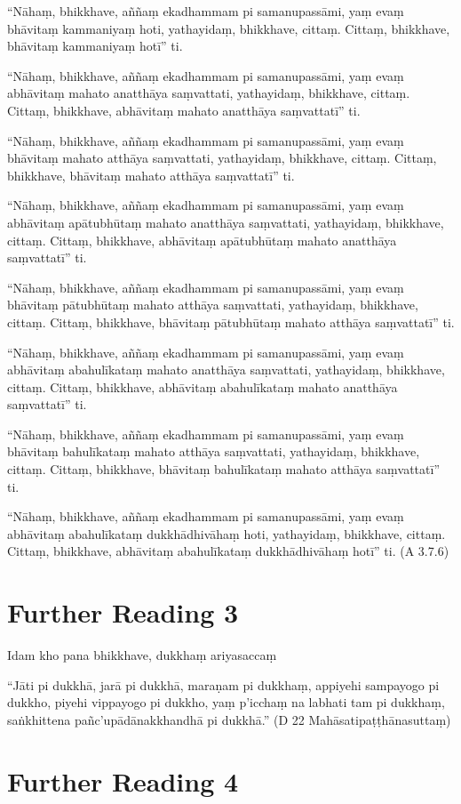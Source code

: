 “Nāhaṃ, bhikkhave, aññaṃ ekadhammam pi samanupassāmi, yaṃ evaṃ bhāvitaṃ kammaniyaṃ hoti, yathayidaṃ, bhikkhave, cittaṃ. Cittaṃ, bhikkhave, bhāvitaṃ kammaniyaṃ hotī” ti.

“Nāhaṃ, bhikkhave, aññaṃ ekadhammam pi samanupassāmi, yaṃ evaṃ abhāvitaṃ mahato anatthāya saṃvattati, yathayidaṃ, bhikkhave, cittaṃ. Cittaṃ, bhikkhave, abhāvitaṃ mahato anatthāya saṃvattatī” ti.

“Nāhaṃ, bhikkhave, aññaṃ ekadhammam pi samanupassāmi, yaṃ evaṃ bhāvitaṃ mahato atthāya saṃvattati, yathayidaṃ, bhikkhave, cittaṃ. Cittaṃ, bhikkhave, bhāvitaṃ mahato atthāya saṃvattatī” ti.

“Nāhaṃ, bhikkhave, aññaṃ ekadhammam pi samanupassāmi, yaṃ evaṃ abhāvitaṃ apātubhūtaṃ mahato anatthāya saṃvattati, yathayidaṃ, bhikkhave, cittaṃ. Cittaṃ, bhikkhave, abhāvitaṃ apātubhūtaṃ mahato anatthāya saṃvattatī” ti.

“Nāhaṃ, bhikkhave, aññaṃ ekadhammam pi samanupassāmi, yaṃ evaṃ bhāvitaṃ pātubhūtaṃ mahato atthāya saṃvattati, yathayidaṃ, bhikkhave, cittaṃ. Cittaṃ, bhikkhave, bhāvitaṃ pātubhūtaṃ mahato atthāya saṃvattatī” ti.

“Nāhaṃ, bhikkhave, aññaṃ ekadhammam pi samanupassāmi, yaṃ evaṃ abhāvitaṃ abahulīkataṃ mahato anatthāya saṃvattati, yathayidaṃ, bhikkhave, cittaṃ. Cittaṃ, bhikkhave, abhāvitaṃ abahulīkataṃ mahato anatthāya saṃvattatī” ti.

“Nāhaṃ, bhikkhave, aññaṃ ekadhammam pi samanupassāmi, yaṃ evaṃ bhāvitaṃ bahulīkataṃ mahato atthāya saṃvattati, yathayidaṃ, bhikkhave, cittaṃ. Cittaṃ, bhikkhave, bhāvitaṃ bahulīkataṃ mahato atthāya saṃvattatī” ti.

“Nāhaṃ, bhikkhave, aññaṃ ekadhammam pi samanupassāmi, yaṃ evaṃ abhāvitaṃ abahulīkataṃ dukkhādhivāhaṃ hoti, yathayidaṃ, bhikkhave, cittaṃ. Cittaṃ, bhikkhave, abhāvitaṃ abahulīkataṃ dukkhādhivāhaṃ hotī” ti. (A 3.7.6)

\section*{Further Reading 3}

Idam kho pana bhikkhave, dukkhaṃ ariyasaccaṃ

“Jāti pi dukkhā, jarā pi dukkhā, maraṇam pi dukkhaṃ, appiyehi sampayogo pi dukkho, piyehi vippayogo pi dukkho‚ yaṃ p’icchaṃ na labhati tam pi dukkhaṃ, saṅkhittena pañc’upādānakkhandhā pi dukkhā.” (D 22 Mahāsatipaṭṭhānasuttaṃ)

\section*{Further Reading 4}

